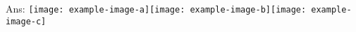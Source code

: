 \documentclass[10pt]{article}
\newcommand{\ans}[1]{{\color{blue}\textsf{Ans}: #1}}
\begin{document}
\begin{exercise}
\begin{enumerate}
	\ans{
	\texttt{[image: example-image-a]}\texttt{[image: example-image-b]}\texttt{[image: example-image-c]}
	}
	\end{enumerate}
	\end{exercise}

	
\end{document}
